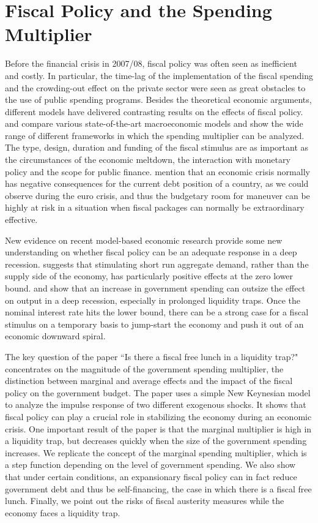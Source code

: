 \documentclass[12pt,a4paper,oneside,titlepage]{article}
\begin{document}
\section{Fiscal Policy and the Spending Multiplier }

Before the financial crisis in 2007/08, fiscal policy was often seen as inefficient and costly. In particular, the time-lag of the implementation of the fiscal spending and the crowding-out effect on the private sector were seen as great obstacles to the use of public spending programs. Besides the theoretical economic arguments, different models have delivered contrasting results on the effects of fiscal policy. \citet{CoenenG..2010} and \citet{Afonso.2010} compare various state-of-the-art macroeconomic models and show the wide range of different frameworks in which the spending multiplier can be analyzed. The type, design, duration and funding of the fiscal stimulus are as important as the circumstances of the economic meltdown, the interaction with monetary policy and the scope for public finance. \citet{Coenen.2010} mention that an economic crisis normally has negative consequences for the current debt position of a country, as we could observe during the euro crisis, and thus the budgetary room for maneuver can be highly at risk in a situation when fiscal packages can normally be extraordinary effective.
\par
\bigskip
New evidence on recent model-based economic research provide some new understanding on whether fiscal policy can be an adequate response in a deep recession. \citet{Eggertsson.2011} suggests that stimulating short run aggregate demand, rather than the supply side of the economy, has particularly positive effects at the zero lower bound. \citet{Davig.2009} and \citet{Christiano.2011} show that an increase in government spending can outsize the effect on output in a deep recession, especially in prolonged liquidity traps. Once the nominal interest rate hits the lower bound, there can be a strong case for a fiscal stimulus on a temporary basis to jump-start the economy and push it out of an economic downward spiral.
\par
\bigskip
The key question of the paper ``Is there a fiscal free lunch in a liquidity trap?" concentrates on the magnitude of the government spending multiplier, the distinction between marginal and average effects and the impact of the fiscal policy on the government budget.
The paper uses a simple New Keynesian model to analyze the impulse response of two different exogenous shocks. It shows that fiscal policy can play a crucial role in stabilizing the economy during an economic crisis. One important result of the paper is that the marginal multiplier is high in a liquidity trap, but decreases quickly when the size of the government spending increases. We replicate the concept of the marginal spending multiplier, which is a step function depending on the level of government spending.
We also show that under certain conditions, an expansionary fiscal policy can in fact reduce government debt and thus be self-financing, the case in which there is a fiscal free lunch. Finally, we point out the risks of fiscal austerity measures while the economy faces a liquidity trap.
\end{document}
